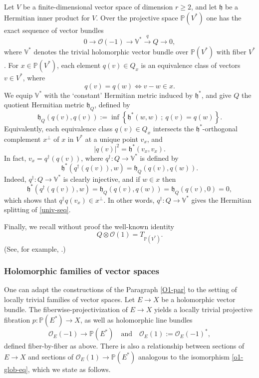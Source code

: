 \documentclass[12pt,hidelinks]{amsart}
\newcommand{\cO}{{\mathcal O}}
\newcommand{\fh}{{\mathfrak h}}
\newcommand{\bbP}{{\mathbb P}}
\newcommand{\bbV}{{\mathbb V}}
\newcommand{\tensor}{\otimes}
\begin{document}
Let $V$ be a finite-dimensional vector space of dimension $r \ge 2$, and let $\fh$ be a Hermitian inner product for $V$.  Over the projective space $\bbP (V^*)$ one has the exact sequence of vector bundles 
\begin{equation}\label{univ-seq}
0 \to \cO (-1) \to \bbV^* \stackrel{q}{\to} Q \to 0,
\end{equation}
where $\bbV^*$ denotes the trivial holomorphic vector bundle over $\bbP (V^*)$ with fiber $V^*$.  For $x \in \bbP (V^*)$, each element $q(v) \in Q_x$ is an equivalence class of vectors $v \in V^*$, where 
\[
q(v) =q(w) \iff v - w \in x.
\]
We equip $\bbV^*$ with the `constant' Hermitian metric induced by $\fh^*$, and give $Q$ the quotient Hermitian metric $\fh _Q$, defined by 
\[
\fh _Q(q(v), q(v)) := \inf \left \{ \fh^* (w,w)\ ;\  q(v)=q(w) \right \}.
\]
Equivalently, each equivalence class $q(v)\in Q_x$ intersects the $\fh^*$-orthogonal complement $x^{\perp}$ of $x$ in $V^*$ at a unique point $v_x$, and 
\[
\left | q(v)\right |^2 = \fh^* (v_x, v_x).
\]
In fact, $v_x = q^{\dagger}(q(v))$, where $q^{\dagger} :Q \to \bbV^*$ is defined by 
\[
\fh^* (q^{\dagger} (q(v)), w) = \fh _Q (q(v), q(w)).
\]
Indeed, $q^{\dagger} :Q \to \bbV^*$ is clearly injective, and if $w \in x$ then 
\[
\fh^* (q^{\dagger}(q(v)), w) = \fh _Q (q(v), q(w)) = \fh _Q (q(v), 0)= 0,
\]
which shows that $q^{\dagger}q(v_x) \in x^{\perp}$.  In other words, $q^{\dagger} : Q \to \bbV^*$ gives the Hermitian splitting of \eqref{univ-seq}.

Finally, we recall without proof the well-known identity
\[
Q\tensor \cO (1) = T_{\bbP (V^*)}.
\]
(See, for example, \cite[Proposition V.15.7, page 279]{dem-book}.)

 
\subsubsection{\sf Holomorphic families of vector spaces}\label{O1-of-E-par}

One can adapt the constructions of the Paragraph \ref{O1-par} to the setting of locally trivial families of vector spaces.  Let $E \to X$ be a holomorphic vector bundle.  The fiberwise-projectivization of $E \to X$ yields a locally trivial projective fibration $p : \bbP(E^*) \to X$, as well as holomorphic line bundles 
\[
\cO_E(-1) \to \bbP(E^*) \quad \text{and} \quad \cO _E(1) := \cO_E(-1)^*,
\]
defined fiber-by-fiber as above.  There is also a relationship between sections of $E \to X$ and sections of $\cO _E(1) \to \bbP(E^*)$ analogous to the isomorphism \eqref{o1-glob-eq}, which we state as follows.
\end{document}
